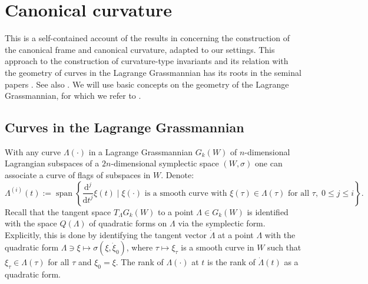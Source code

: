 \documentclass[11pt,a4paper]{article}
\theoremstyle{plain}
\theoremstyle{definition}
\theoremstyle{remark}
\numberwithin{equation}{section}
\DeclareMathOperator{\spn}{\mathrm{span}}
\newcommand{\di}{\mathrm{d}}
\begin{document}
\section{Canonical curvature}\label{a:canonicalframe}

This is a self-contained account of the results in \cite{ZeLi} concerning the construction of the canonical frame and canonical curvature, adapted to our settings. This approach to the construction of curvature-type invariants and its relation with the geometry of curves in the Lagrange Grassmannian has its roots in the seminal papers \cite{AG1,AG2}. See also \cite[Appendix]{nostrolibro}. We will use basic concepts on the geometry of the Lagrange Grassmannian, for which we refer to \cite[Ch.\@ 14]{nostrolibro}.


\subsection{Curves in the Lagrange Grassmannian}\label{sec:curvesLag}
With any curve $\Lambda(\cdot)$ in a Lagrange Grassmannian $G_k(W)$ of $n$-dimensional Lagrangian subspaces of a $2n$-dimensional symplectic space $(W,\sigma)$ one can associate a curve of flags of subspaces in $W$. Denote:
\begin{equation}
\Lambda^{(i)}(t):= \spn\left\{\frac{\di^j}{\di t^j}\xi(t) \mid \xi(\cdot) \text{ is a smooth curve with $\xi(\tau)\in \Lambda(\tau)$ for all $\tau$},\; 0\leq j\leq i \right\}.
\end{equation}
Recall that the tangent space $T_\Lambda G_k(W)$ to a point $\Lambda \in G_k(W)$ is identified with the space $Q(\Lambda)$ of quadratic forms on $\Lambda$ via the symplectic form. Explicitly, this is done by identifying the tangent vector $\dot{\Lambda}$ at a point $\Lambda$ with the quadratic form $\Lambda \ni \xi \mapsto \sigma(\xi,\dot\xi_0)$, where $\tau\mapsto \xi_\tau$ is a smooth curve in $W$ such that $\xi_\tau\in \Lambda(\tau)$ for all $\tau$ and $\xi_0 = \xi$. The rank of $\Lambda(\cdot)$ at $t$ is the rank of $\dot{\Lambda}(t)$ as a quadratic form.
\end{document}
